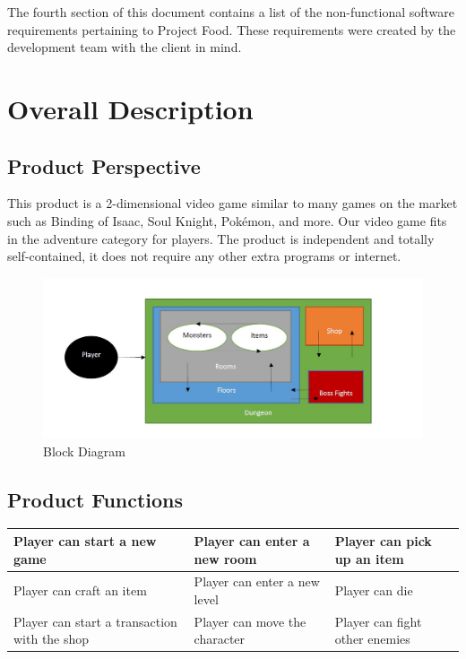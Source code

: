 \documentclass[12pt, titlepage]{article}
\begin{document}
  The fourth section of this document contains a list of the non-functional software requirements pertaining to Project Food. These requirements were created by the development team with the client in mind.

\section{Overall Description}

  \subsection{Product Perspective}
  This product is a 2-dimensional video game similar to many games on the market such as Binding of Isaac, Soul Knight, Pokémon, and more. Our video game fits in the adventure category for players. The product is independent and totally self-contained, it does not require any other extra programs or internet.
  
   \begin{figure}[htp]
        \centering
        \includegraphics[width=16cm]{blckdg.JPG}
        \caption{Block Diagram}
        \label{fig:block}
   \end{figure}


  \subsection{Product Functions}
   \begin{center}
    \begin{tabular}{ | m{5em} | m{5em}| m{5em} | }
    \hline
    Player can start a new game & Player can enter a new room & Player can pick up an item \\
    \hline
    Player can craft an item & Player can enter a new level & Player can die \\
    \hline
    Player can start a transaction with the shop & Player can move the character & Player can fight other enemies \\
    \hline
    \end{tabular}
    \end{center}
\end{document}
